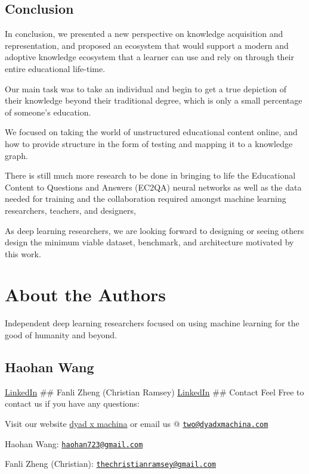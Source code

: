\documentclass{acm_proc_article-sp}
\begin{document}
\hypertarget{mce-responses}{}
\hypertarget{mce-error-response}{}

\hypertarget{mce-success-response}{}

\section{Conclusion}\label{conclusion}

In conclusion, we presented a new perspective on knowledge acquisition
and representation, and proposed an ecosystem that would support a
modern and adoptive knowledge ecosystem that a learner can use and rely
on through their entire educational life-time.

Our main task was to take an individual and begin to get a true
depiction of their knowledge beyond their traditional degree, which is
only a small percentage of someone's education.

We focused on taking the world of unstructured educational content
online, and how to provide structure in the form of testing and mapping
it to a knowledge graph.

There is still much more research to be done in bringing to life the
Educational Content to Questions and Answers (EC2QA) neural networks as
well as the data needed for training and the collaboration required
amongst machine learning researchers, teachers, and designers,

As deep learning researchers, we are looking forward to designing or
seeing others design the minimum viable dataset, benchmark, and
architecture motivated by this work.

\chapter{About the Authors}\label{about-the-authors}

Independent deep learning researchers focused on using machine learning
for the good of humanity and beyond.

\section{Haohan Wang}\label{haohan-wang}

\href{https://www.linkedin.com/in/haohanw}{LinkedIn} \#\# Fanli Zheng
(Christian Ramsey)
\href{https://www.linkedin.com/in/christianramsey/}{LinkedIn} \#\#
Contact Feel Free to contact us if you have any questions:

Visit our website \href{dyadxmachina.com}{dyad x machina} or email us @
\href{mailto:two@dyadxmachina.com}{\nolinkurl{two@dyadxmachina.com}}

Haohan Wang:
\href{mailto:haohan723@gmail.com}{\nolinkurl{haohan723@gmail.com}}

Fanli Zheng (Christian):
\href{mailto:thechristianramsey@gmail.com}{\nolinkurl{thechristianramsey@gmail.com}}
\setlength{\parindent}{0in}
\end{document}
